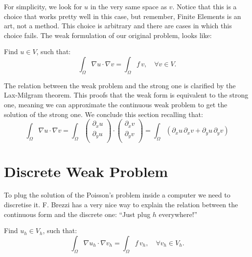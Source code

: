 \documentclass[11pt]{amsart}
\begin{document}
For simplicity, we look for $u$ in the very same space as $v$. 
Notice that this is a choice that works pretty well in this case, but
remember, Finite Elements is an art, not a method. This choice 
is arbitrary and there are cases in which this choice fails. 
The weak formulation 
of our original problem, looks like:

Find $u\in V$, such that:
\[
\int_\Omega \nabla u \cdot \nabla v = \int_\Omega f\, v, \quad \forall v \in V.
\]

The relation between the weak problem and the strong one 
is clarified by the Lax-Milgram theorem. This proofs 
that the weak form is equivalent to the strong one, meaning 
we can approximate the continuous weak problem to get the solution 
of the strong one. We conclude this section recalling that:
\[
\int_\Omega \nabla u \cdot \nabla v = \int_\Omega 
\left(
\begin{array}{c}
\partial_x u\\
\partial_y u\\
\end{array}
\right) \cdot
\left(
\begin{array}{c}
\partial_x v\\
\partial_y v\\
\end{array}
\right) = 
\int_\Omega \left(
\partial_x u\, \partial_x v + 
\partial_y u\, \partial_y v\right)
\]

\section{Discrete Weak Problem}

To plug the solution of the Poisson's problem inside a computer 
we need to discretise it. F. Brezzi has a very nice way to explain 
the relation between the continuous form and the discrete one:
``Just plug $h$ everywhere!''

Find $u_h\in V_h$, such that:
\[
\int_\Omega \nabla u_h \cdot \nabla v_h = \int_\Omega f\, v_h, \quad \forall v_h \in V_h.
\]
\end{document}
